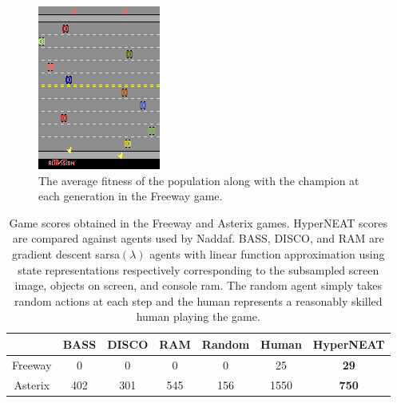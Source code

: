 \documentclass{acm_proc_article-sp}
\begin{document}
\begin{figure}[ht]
\begin{center}
\includegraphics[width=\columnwidth]{figures/freeway}
\end{center}
\caption{The average fitness of the population along with the champion at each generation in the Freeway game.}
\label{fig:freeway-curve}
\end{figure}

\begin{table}
\begin{center}
\begin{tabular}{|c|c|c|c|c|c|c|}
\hline
~       & BASS & DISCO & RAM & Random & Human & HyperNEAT \\ \hline
Freeway & 0    & 0     & 0   & 0      & 25    & \textbf{29}        \\ \hline
Asterix & 402  & 301   & 545 & 156    & 1550  & \textbf{750}       \\ 
\hline
\end{tabular}
\end{center}
\label{tab:results-table}
\caption{Game scores obtained in the Freeway and Asterix games. HyperNEAT scores are compared against agents used by Naddaf\cite{naddaf10}. BASS, DISCO, and RAM are gradient descent sarsa$(\lambda)$ agents with linear function approximation using state representations respectively corresponding to the subsampled screen image, objects on screen, and console ram. The random agent simply takes random actions at each step and the human represents a reasonably skilled human playing the game.}
\end{table}
\end{document}
